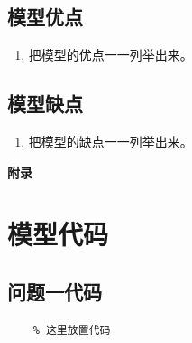 \documentclass{cumcm}
\begin{document}
\subsection{模型优点}
\begin{enumerate}
	\item 把模型的优点一一列举出来。
\end{enumerate}

\subsection{模型缺点}
\begin{enumerate}
	\item 把模型的缺点一一列举出来。
\end{enumerate}



\newpage
\appendix
\textbf{附录}
\section{模型代码}
\subsection{问题一代码}
\begin{lstlisting}
	% 这里放置代码
\end{lstlisting}
\end{document}
